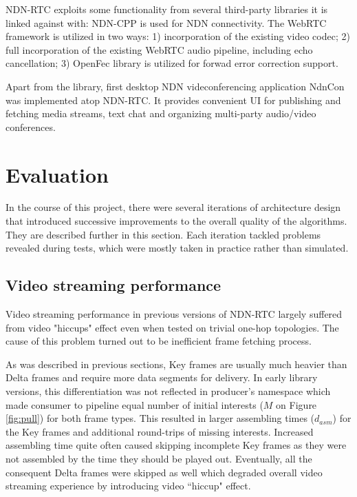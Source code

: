 \documentclass{icn/sig-alternate-2012} %
\newcommand{\ndnrtcName}{NDN-RTC} %
\newcommand{\ndnconName}{NdnCon}
\begin{document}
\ndnrtcName{} exploits some functionality from several third-party libraries it is linked against with: NDN-CPP \cite{ndnccl} is used for NDN connectivity. The WebRTC framework \cite{webrtc} is utilized in two ways: 1) incorporation of the existing video codec; 2) full incorporation of the existing WebRTC audio pipeline, including echo cancellation;  3) OpenFec \cite{openfec} library is utilized for forwad error correction support.

Apart from the library, first desktop NDN videconferencing application \ndnconName{} \cite{ndncon} was implemented atop \ndnrtcName{}. It provides convenient UI for publishing and fetching media streams, text chat and organizing multi-party audio/video conferences.

\section{Evaluation}
\label{sec:eval} 
In the course of this project, there were several iterations of architecture design that introduced successive improvements to the overall quality of the algorithms. They are described further in this section. Each iteration tackled problems revealed during tests, which were mostly taken in practice rather than simulated.

\subsection{Video streaming performance}
Video streaming performance in previous versions of \ndnrtcName{} largely suffered from video "hiccups" effect even when tested on trivial one-hop topologies. The cause of this problem turned out to be inefficient frame fetching process.

As was described in previous sections, Key frames are usually much heavier than Delta frames and require more data segments for delivery. In early library versions, this differentiation was not reflected in producer's namespace which made consumer to pipeline equal number of initial interests ($M$ on Figure \ref{fig:pull}) for both frame types. This resulted in larger assembling times ($d_{asm}$) for the Key frames and additional round-trips of missing interests. Increased assembling time quite often caused skipping incomplete Key frames as they were not assembled by the time they should be played out. Eventually, all the consequent Delta frames were skipped as well which degraded overall video streaming experience by introducing video ``hiccup" effect.
\end{document}
